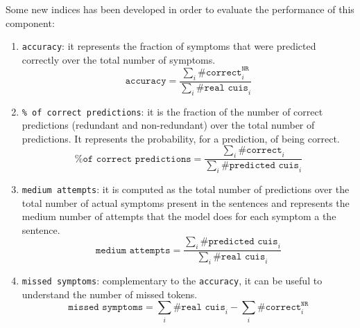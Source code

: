 Some new indices has been developed in order to evaluate the performance of this component:
\begin{enumerate}

  \item \texttt{accuracy}: it represents the fraction of symptoms that were predicted correctly over the total number of symptoms.
  \begin{equation}
  \texttt{accuracy} = \frac{\sum_{i}{\texttt{\#correct}_{i}^{\texttt{NR}}}}{\sum_{i}{\texttt{\#real cuis}_{i}}}
  \end{equation}

  \item \texttt{\% of correct predictions}: it is the fraction of the number of correct predictions (redundant and non-redundant) over the total number of predictions. It represents the probability, for a prediction, of being correct.
  \begin{equation}
  \texttt{\% of correct predictions} = \frac{\sum_{i}{\texttt{\#correct}_{i}}}{\sum_{i}{\texttt{\#predicted cuis}_{i}}}
  \end{equation}

  \item \texttt{medium attempts}: it is computed as the total number of predictions over the total number of actual symptoms present in the sentences and represents the medium number of attempts that the model does for each symptom a the sentence.
  \begin{equation}
  \texttt{medium attempts} = \frac{\sum_{i}{\texttt{\#predicted cuis}_{i}}}{\sum_{i}{\texttt{\#real cuis}_{i}}}
  \end{equation}

  \item \texttt{missed symptoms}: complementary to the \texttt{accuracy}, it can be useful to understand the number of missed tokens.
  \begin{equation}
  \texttt{missed symptoms} = \sum_{i}{\texttt{\#real cuis}_{i}} - \sum_{i}{\texttt{\#correct}^{\texttt{NR}}_{i}}
  \end{equation}

\end{enumerate}

